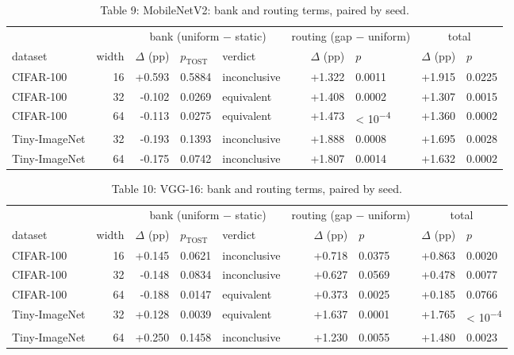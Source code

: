 \documentclass{article}
\begin{document}
\begin{table}
\caption{Table 9: MobileNetV2: bank and routing terms, paired by seed.}

\begin{tabular}{l r rll rl rl}
\toprule
& & \multicolumn{3}{c}{bank (uniform − static)}
& \multicolumn{2}{c}{routing (gap − uniform)}
& \multicolumn{2}{c}{total} \\

dataset & width & $\Delta$ (pp) & $p_{\text{TOST}}$ & verdict & $\Delta$ (pp) & $p$ & $\Delta$ (pp) & $p$ \\
\midrule
CIFAR‑100 & 16 & +0.593 & 0.5884 & inconclusive & +1.322 & 0.0011 & +1.915 & 0.0225 \\
CIFAR‑100 & 32 & -0.102 & 0.0269 & equivalent & +1.408 & 0.0002 & +1.307 & 0.0015 \\
CIFAR‑100 & 64 & -0.113 & 0.0275 & equivalent & +1.473 & < 10\textsuperscript{−4} & +1.360 & 0.0002 \\
Tiny‑ImageNet & 32 & -0.193 & 0.1393 & inconclusive & +1.888 & 0.0008 & +1.695 & 0.0028 \\
Tiny‑ImageNet & 64 & -0.175 & 0.0742 & inconclusive & +1.807 & 0.0014 & +1.632 & 0.0002 \\
\bottomrule
\end{tabular}
\end{table}

\begin{table}
\caption{Table 10: VGG-16: bank and routing terms, paired by seed.}

\begin{tabular}{l r rll rl rl}
\toprule
& & \multicolumn{3}{c}{bank (uniform − static)}
& \multicolumn{2}{c}{routing (gap − uniform)}
& \multicolumn{2}{c}{total} \\

dataset & width & $\Delta$ (pp) & $p_{\text{TOST}}$ & verdict & $\Delta$ (pp) & $p$ & $\Delta$ (pp) & $p$ \\
\midrule
CIFAR‑100 & 16 & +0.145 & 0.0621 & inconclusive & +0.718 & 0.0375 & +0.863 & 0.0020 \\
CIFAR‑100 & 32 & -0.148 & 0.0834 & inconclusive & +0.627 & 0.0569 & +0.478 & 0.0077 \\
CIFAR‑100 & 64 & -0.188 & 0.0147 & equivalent & +0.373 & 0.0025 & +0.185 & 0.0766 \\
Tiny‑ImageNet & 32 & +0.128 & 0.0039 & equivalent & +1.637 & 0.0001 & +1.765 & < 10\textsuperscript{−4} \\
Tiny‑ImageNet & 64 & +0.250 & 0.1458 & inconclusive & +1.230 & 0.0055 & +1.480 & 0.0023 \\
\bottomrule
\end{tabular}
\end{table}
\end{document}
